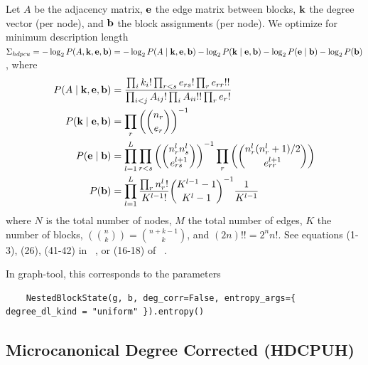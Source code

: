 \documentclass[aps,pre,superscriptaddress]{article}
\begin{document}
Let $A$ be the adjacency matrix, $\vb{e}$ the edge matrix between blocks, $\vb{k}$ the degree vector (per node), and $\vb{b}$ the block assignments (per node).
We optimize for minimum description length $\Sigma_{hdpcu} = -\log_2P(A, \vb{k}, \vb{e}, \vb{b}) = -\log_2P(A \mid \vb{k}, \vb{e}, \vb{b}) - \log_2 P(\vb{k} \mid \vb{e}, \vb{b}) - \log_2 P(\vb{e} \mid \vb{b}) - \log_2 P(\vb{b}) $, where
\begin{align}
	P(A \mid \vb{k}, \vb{e}, \vb{b}) & = \frac{ \prod_i k_i! \prod_{r < s} e_{rs}! \prod_{r} e_{rr}!!} {\prod_{i < j} A_{ij}! \prod_i A_{ii}!! \prod_r e_r!}                                      \\
	P(\vb{k} \mid \vb{e}, \vb{b})    & = \prod_r \left( \binom{n_r}{e_r} \right)^{-1}                                                                                                             \\
	P(\vb{e} \mid \vb{b})            & = \prod_{l=1}^{L} \prod_{r < s} \left( \binom{n_r^l n_s^l}{e_{rs}^{l+1}} \right)^{-1} \prod_r \left( \binom{ n_r^l (n_r^l + 1) / 2 }{e_{rr}^{l+1} }\right) \\
	P(\vb{b})                        & = \prod_{l=1}^L \frac{\prod_r n_r^l!}{K^{l-1}!} \binom{ K^{l-1} - 1}{K^l - 1}^{-1} \frac{1}{K^{l-1}}
\end{align}
where $N$ is the total number of nodes, $M$ the total number of edges, $K$ the number of blocks, $\left( \binom{n}{k} \right) = \binom{n + k - 1}{k}$, and $(2n)!! = 2^n n!$.
See equations (1-3), (26), (41-42) in ~\cite{peixoto17-01}, or (16-18) of ~\cite{funke19-04}.

In graph-tool, this corresponds to the parameters
\begin{verbatim}
    NestedBlockState(g, b, deg_corr=False, entropy_args={ degree_dl_kind = "uniform" }).entropy()
\end{verbatim}

\subsection{Microcanonical Degree Corrected (HDCPUH)}
\end{document}
